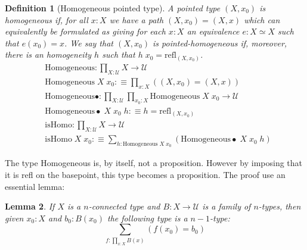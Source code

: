 \documentclass{article}
\newtheorem{defi}{Definition}
\newtheorem{lem}[defi]{Lemma}
\begin{document}
\begin{defi}[Homogeneous pointed type]
    A pointed type $(X,x_0)$ is homogeneous if, for all $x : X$ we have a path $(X,x_0)= (X,x)$ which can
    equivalently be formulated as giving for each $x : X$ an equivalence $e : X \simeq X$ such that 
    $e(x_0) = x$. We say that $(X,x_0)$ is pointed-homogeneous if, moreover, there is an homogeneity $h$ such
    that $h\;x_0 = \mathrm{refl}_{(X,x_0)}$.
    \begin{align*}
        &\mathrm{Homogeneous} : \prod_{X : \mathcal U} X \to\mathcal U\\
        &\mathrm{Homogeneous}\;X\;x_0 :\equiv \prod_{x : X} ((X,x_0) = (X,x))\\
        &\mathrm{Homogeneous}\bullet : \prod_{X : \mathcal U} \prod_{x_0 : X} \mathrm{Homogeneous}\;X\;x_0 \to
        \mathcal U\\
        &\mathrm{Homogeneous}\bullet\;X\;x_0\;h :\equiv h = \mathrm{refl}_{(X,x_0)}\\
        &\mathrm{isHomo} : \prod_{X : \mathcal U} X \to\mathcal U\\
        &\mathrm{isHomo}\;X\;x_0 :\equiv \sum_{h : \mathrm{Homogeneous}\;X\;x_0} 
        (\mathrm{Homogeneous}\bullet\;X\;x_0\;h)
    \end{align*}
\end{defi}

The type Homogeneous is, by itself, not a proposition. However by imposing that it is refl on the basepoint,
this type becomes a proposition. The proof use an essential lemma:

\begin{lem}
    If $X$ is a $n$-connected type and $B : X \to \mathcal U$ is a family of $n$-types, then given $x_0 : X$
    and $b_0 : B(x_0)$ the following type is a $n-1$-type:
    $$\sum_{f : \prod_{x : X}B(x)} (f(x_0)=b_0)$$
\end{lem}
\end{document}
